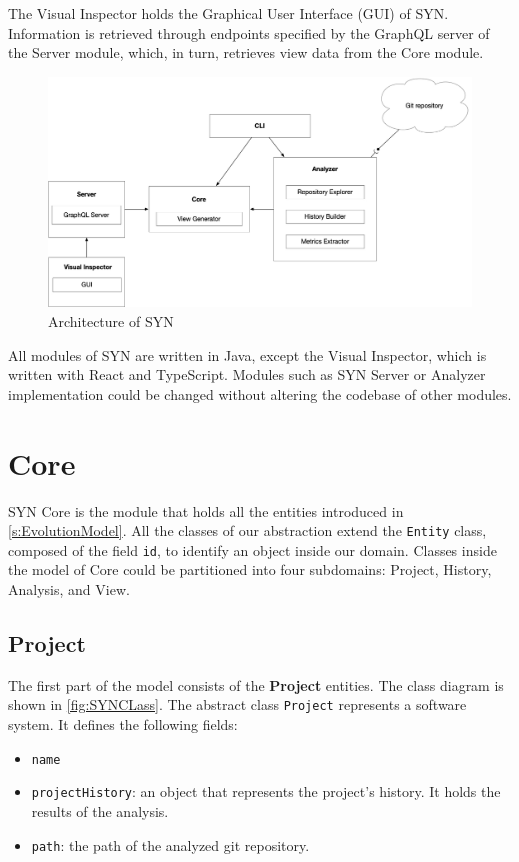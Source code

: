 The Visual Inspector holds the Graphical User Interface (GUI) of SYN. Information is retrieved through endpoints specified by the GraphQL server of the Server module, which, in turn, retrieves view data from the Core module. 


\begin{figure}
    \center
    \includegraphics[width=\textwidth]{SYNArchitecture.jpg}
    \caption{Architecture of SYN}
    \label{fig:architecture}
\end{figure}

All modules of SYN are written in Java, except the Visual Inspector, which is written with React and TypeScript. 
Modules such as SYN Server or Analyzer implementation could be changed without altering the codebase of other modules. 

\section{Core}
SYN Core is the module that holds all the entities introduced in \autoref{s:EvolutionModel}. 
All the classes of our abstraction extend the \texttt{Entity} class, composed of the field \texttt{id}, to identify an object inside our domain. 
Classes inside the model of Core could be partitioned into four subdomains: Project, History, Analysis, and View. 

\subsection{Project}
The first part of the model consists of the \textbf{Project} entities. 
The class diagram is shown in \autoref{fig:SYNCLass}. The abstract class \texttt{Project} represents a software system. It defines the following fields:
\begin{itemize}
    \item \texttt{name}
    \item \texttt{projectHistory}: an object that represents the project's history. It holds the results of the analysis. 
    \item \texttt{path}: the path of the analyzed git repository. 
\end{itemize}

